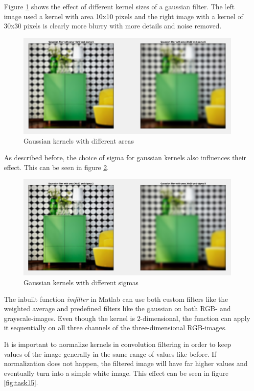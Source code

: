 \documentclass[11pt]{article}
\begin{document}
Figure \ref{fig:task13} shows the effect of different kernel sizes of a gaussian filter. The left image used a kernel with area 10x10 pixels and the right image with a kernel of 30x30 pixels is clearly more blurry with more details and noise removed.

\begin{figure}[!hbt]
  \includegraphics[width=\textwidth]{task13}
  \caption{Gaussian kernels with different areas}
  \label{fig:task13}
\end{figure}

As described before, the choice of sigma for gaussian kernels also influences their effect. This can be seen in figure \ref{fig:task14}.

\begin{figure}[!hbt]
  \includegraphics[width=\textwidth]{task14}
  \caption{Gaussian kernels with different sigmas}
  \label{fig:task14}
\end{figure}

The inbuilt function \textit{imfilter} in Matlab can use both custom filters like the weighted average and predefined filters like the gaussian on both RGB- and grayscale-images. Even though the kernel is 2-dimensional, the function can apply it sequentially on all three channels of the three-dimensional RGB-images.

It is important to normalize kernels in convolution filtering in order to keep values of the image generally in the same range of values like before. If normalization does not happen, the filtered image will have far higher values and eventually turn into a simple white image. This effect can be seen in figure \ref{fig:task15}.
\end{document}
